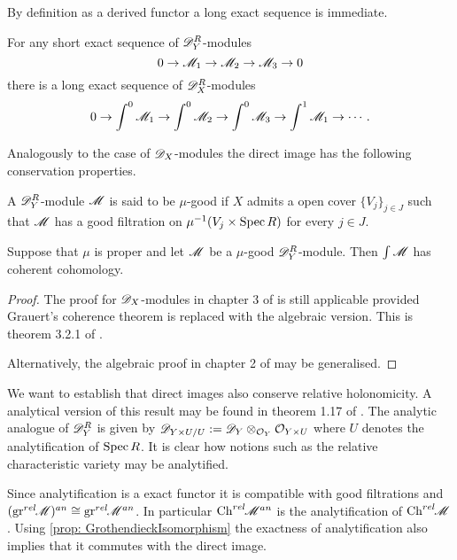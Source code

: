     By definition as a derived functor a long exact sequence is immediate.
    \begin{proposition}
        For any short exact sequence of $\mathscr{D}_Y^R$-modules
        $$0\to \mathscr{M}_1 \to \mathscr{M}_2 \to \mathscr{M}_3 \to 0$$
        there is a long exact sequence of $\mathscr{D}_X^R$-modules
        $$0\to \int^0 \mathscr{M}_1 \to \int^0 \mathscr{M}_2 \to \int^0 \mathscr{M}_3 \to \int^1 \mathscr{M}_1 \to \cdots. $$
    \end{proposition}
    Analogously to the case of $\mathscr{D}_X$-modules the direct image has the following conservation properties.
  \begin{definition}
      A $\mathscr{D}_Y^R$-module $\mathscr{M}$ is said to be $\mu$-good if $X$ admits a open cover $\{V_j\}_{j\in J}$ such that $\mathscr{M}$ has a good filtration on $\mu^{-1}(V_j\times \operatorname{Spec} R)$ for every $j\in J$.
  \end{definition}
  \begin{theorem}
      Suppose that $\mu$ is proper and let $\mathscr{M}$ be a $\mu$-good $\mathscr{D}_Y^R$-module. Then $\int \mathscr{M}$ has coherent cohomology.
  \end{theorem}
  \begin{proof}
    The proof for $\mathscr{D}_X$-modules in chapter 3 of \cite{sabbah2011introduction} is still applicable provided Grauert's coherence theorem is replaced with the algebraic version. This is theorem 3.2.1 of \cite{EGAIII}.

    Alternatively, the algebraic proof in chapter 2 of \cite{hotta2007d} may be generalised.
  \end{proof}
  We want to establish that direct images also conserve relative holonomicity.
  A analytical version of this result may be found in theorem 1.17 of \cite{monteiro2016riemann}.
  The analytic analogue of $\mathscr{D}_{Y}^R$ is given by $\mathscr{D}_{Y\times U/U}:= \mathscr{D}_Y\otimes_{\mathcal{O}_Y}\mathcal{O}_{Y\times U}$ where $U$ denotes the analytification of $\operatorname{Spec} R$.
  It is clear how notions such as the relative characteristic variety may be analytified.

  Since analytification is a exact functor it is compatible with good filtrations and $(\operatorname{gr}^{rel}\mkern-5mu\mathscr{M})^{an} \cong \operatorname{gr}^{rel}\mkern-5mu \mathscr{M}^{an}$.
  In particular $\operatorname{Ch}^{rel}\mkern-5mu \mathscr{M}^{an}$ is the analytification of $\operatorname{Ch}^{rel}\mkern-5mu\mathscr{M}$.
  Using \cref{prop: GrothendieckIsomorphism} the exactness of analytification also implies that it commutes with the direct image.

